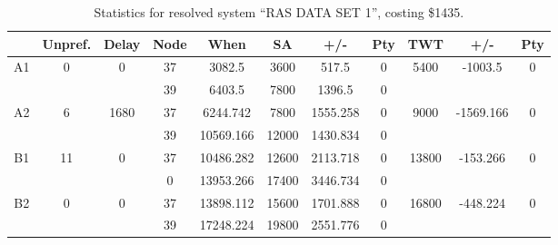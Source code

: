 \begin{sidewaystable}
\footnotesize
\caption{Statistics for resolved system ``RAS DATA SET 1'', costing \$1435.}
\centering
\begin{tabular}{c||c|c||c|c|c|c|c||c|c|c}
  \hline \hline
  &
  Unpref. & 
  Delay &
  Node &
  When &
  SA &
  +/- &
  Pty &
  TWT &
  +/- &
  Pty \\
      \hline
      \multirow{2}{*}{A1} &
      \multirow{2}{*}{0} &
      \multirow{2}{*}{0} &
      37 &
      3082.5 &
      3600 &
        517.5 &
        0 &
      \multirow{2}{*}{5400} &
        \multirow{2}{*}{-1003.5} &
        \multirow{2}{*}{0}
      \\
      \cline{4-8}
       &
       &
       &
      39 &
      6403.5 &
      7800 &
        1396.5 &
        0 &
      
         &
        
      \\
      \hline
      \multirow{2}{*}{A2} &
      \multirow{2}{*}{6} &
      \multirow{2}{*}{1680} &
      37 &
      6244.742 &
      7800 &
        1555.258 &
        0 &
      \multirow{2}{*}{9000} &
        \multirow{2}{*}{-1569.166} &
        \multirow{2}{*}{0}
      \\
      \cline{4-8}
       &
       &
       &
      39 &
      10569.166 &
      12000 &
        1430.834 &
        0 &
      
         &
        
      \\
      \hline
      \multirow{2}{*}{B1} &
      \multirow{2}{*}{11} &
      \multirow{2}{*}{0} &
      37 &
      10486.282 &
      12600 &
        2113.718 &
        0 &
      \multirow{2}{*}{13800} &
        \multirow{2}{*}{-153.266} &
        \multirow{2}{*}{0}
      \\
      \cline{4-8}
       &
       &
       &
      0 &
      13953.266 &
      17400 &
        3446.734 &
        0 &
      
         &
        
      \\
      \hline
      \multirow{2}{*}{B2} &
      \multirow{2}{*}{0} &
      \multirow{2}{*}{0} &
      37 &
      13898.112 &
      15600 &
        1701.888 &
        0 &
      \multirow{2}{*}{16800} &
        \multirow{2}{*}{-448.224} &
        \multirow{2}{*}{0}
      \\
      \cline{4-8}
       &
       &
       &
      39 &
      17248.224 &
      19800 &
        2551.776 &
        0 &
      

\end{tabular}
\end{sidewaystable}
